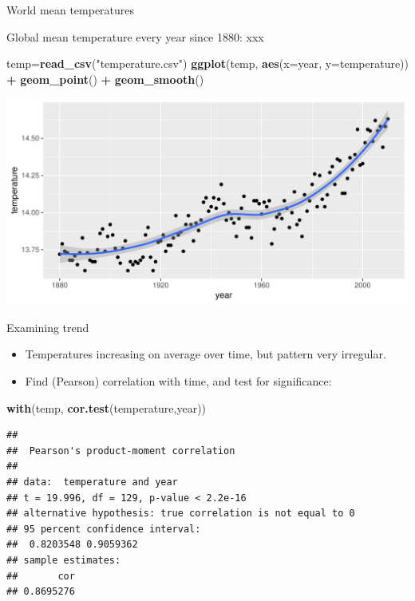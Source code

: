 \documentclass[ignorenonframetext,]{beamer}
\newenvironment{Shaded}{\begin{snugshade}}{\end{snugshade}}
\newcommand{\DataTypeTok}[1]{\textcolor[rgb]{0.13,0.29,0.53}{#1}}
\newcommand{\KeywordTok}[1]{\textcolor[rgb]{0.13,0.29,0.53}{\textbf{#1}}}
\newcommand{\NormalTok}[1]{#1}
\newcommand{\OperatorTok}[1]{\textcolor[rgb]{0.81,0.36,0.00}{\textbf{#1}}}
\newcommand{\StringTok}[1]{\textcolor[rgb]{0.31,0.60,0.02}{#1}}
\providecommand{\tightlist}{%
  \setlength{\itemsep}{0pt}\setlength{\parskip}{0pt}}
\begin{document}
\begin{frame}[fragile]{World mean temperatures}
\protect\hypertarget{world-mean-temperatures}{}

Global mean temperature every year since 1880: xxx

\small

\begin{Shaded}
\begin{Highlighting}[]
\NormalTok{temp=}\KeywordTok{read_csv}\NormalTok{(}\StringTok{"temperature.csv"}\NormalTok{)}
\KeywordTok{ggplot}\NormalTok{(temp, }\KeywordTok{aes}\NormalTok{(}\DataTypeTok{x=}\NormalTok{year, }\DataTypeTok{y=}\NormalTok{temperature)) }\OperatorTok{+}\StringTok{ }
\StringTok{  }\KeywordTok{geom_point}\NormalTok{() }\OperatorTok{+}\StringTok{ }\KeywordTok{geom_smooth}\NormalTok{()}
\end{Highlighting}
\end{Shaded}

\includegraphics{figure/unnamed-chunk-6-1.pdf} \normalsize

\end{frame}

\begin{frame}[fragile]{Examining trend}
\protect\hypertarget{examining-trend}{}

\begin{itemize}
\tightlist
\item
  Temperatures increasing on average over time, but pattern very
  irregular.
\item
  Find (Pearson) correlation with time, and test for significance:
\end{itemize}

\begin{Shaded}
\begin{Highlighting}[]
\KeywordTok{with}\NormalTok{(temp, }\KeywordTok{cor.test}\NormalTok{(temperature,year))}
\end{Highlighting}
\end{Shaded}

\begin{verbatim}
## 
##  Pearson's product-moment correlation
## 
## data:  temperature and year
## t = 19.996, df = 129, p-value < 2.2e-16
## alternative hypothesis: true correlation is not equal to 0
## 95 percent confidence interval:
##  0.8203548 0.9059362
## sample estimates:
##       cor 
## 0.8695276
\end{verbatim}

\end{frame}
\end{document}
